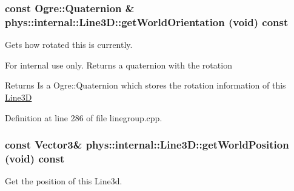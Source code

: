 \hypertarget{classphys_1_1internal_1_1Line3D_a68aea39fc0eee3eeb744c5cd151ef209}{
\subsubsection[{getWorldOrientation}]{\setlength{\rightskip}{0pt plus 5cm}const Ogre::Quaternion \& phys::internal::Line3D::getWorldOrientation (void) const}}
\label{d4/db5/classphys_1_1internal_1_1Line3D_a68aea39fc0eee3eeb744c5cd151ef209}


Gets how rotated this is currently. 

\begin{DoxyInternal}{For internal use only.}
Returns a quaternion with the rotation \begin{DoxyReturn}{Returns}
Is a Ogre::Quaternion which stores the rotation information of this \hyperlink{classphys_1_1internal_1_1Line3D}{Line3D} 
\end{DoxyReturn}
\end{DoxyInternal}


Definition at line 286 of file linegroup.cpp.

\hypertarget{classphys_1_1internal_1_1Line3D_a5bf47edcb7d369718c40c56d9db11b29}{
\subsubsection[{getWorldPosition}]{\setlength{\rightskip}{0pt plus 5cm}const {\bf Vector3}\& phys::internal::Line3D::getWorldPosition (void) const}}
\label{d4/db5/classphys_1_1internal_1_1Line3D_a5bf47edcb7d369718c40c56d9db11b29}


Get the position of this Line3d. 

